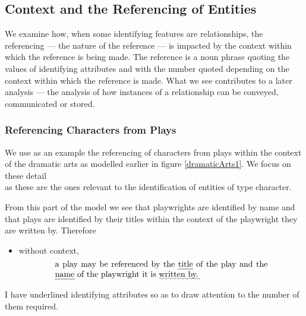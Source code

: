 \subsection{Context and the Referencing of Entities}
\mynote
We examine how,  when some identifying features are relationships, the referencing 
--- the nature of the reference ---   
is impacted by the context within which the reference is being made. 
The reference is  a noun phrase quoting the values of identifying attributes
and with the number quoted depending on 
the context within which the reference is made.
What we see contributes to a later analysis --- the analysis of  how 
instances of a relationship can be conveyed, communicated or stored.
\subsubsection{Referencing Characters from Plays}
\mynote
 We use as an example the referencing of characters from  plays
 within the context of  the  dramatic arts
   as modelled earlier in figure \ref{dramaticArts1}.
We focus on these detail
\begin{equation*}

\end{equation*}
as these are the ones relevant to the identification of entities 
of type character.

From this part of the model we see that playwrights are identified by name and that plays are identified by their titles within the context of the playwright they are written by. Therefore
\begin{itemize} 
\item without context, 
\begin{equation} 
\label{absolutePlayReferencing}
\text{\parbox{9cm}{a  play 
may be referenced by the \uline{title} of the play and the \uline{name} of the playwright it is \uwave{written by.}}}
\end{equation}
\end{itemize}
I have underlined  identifying attributes so as to draw attention to the number of them required.

